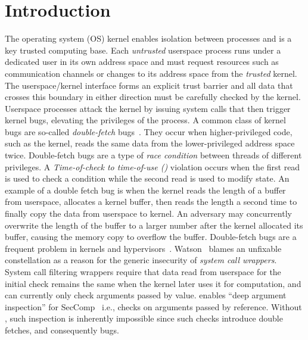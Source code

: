 \documentclass[letterpaper,twocolumn,10pt]{article}
\begin{document}
\section{Introduction}

The operating system (OS) kernel enables isolation between processes and is 
a key trusted computing
base. Each \emph{untrusted} userspace process runs under a
dedicated user in its own address space and must request resources such as
communication channels or changes to its address space from the \emph{trusted}
kernel. The userspace/kernel interface forms an explicit trust barrier
and all data that crosses this boundary in either direction must be carefully 
checked by the kernel.
%
Userspace processes attack the kernel by issuing system calls that then trigger
kernel bugs, elevating the privileges of the process.
%
A common class of kernel bugs are so-called \emph{double-fetch}
bugs~\cite{serna08doublefetch, twizsgrakky07ring0, wilhelm2016xenpwn,
wang2018survey}. They occur when higher-privileged code, such as
the kernel, reads the same data from the lower-privileged address space twice.
%
Double-fetch bugs are a type of
\emph{race condition} between threads of different privileges. A
\emph{Time-of-check to time-of-use (\tocttou)} violation occurs when the first
read is used to check a condition while the second read is used to modify
state.
%
An example of a double fetch bug is when the kernel reads the length of a buffer
from userspace, allocates a kernel buffer, then reads the length a second time
to finally copy the data from userspace to kernel. An adversary may concurrently
overwrite the length of the buffer to a larger number after the kernel allocated
its buffer, causing the memory copy to overflow the buffer.
%
Double-fetch bugs are a frequent problem in kernels and
hypervisors~\cite{cve201812633, cve202012652, cve20131332, cve201920610,
cve20158550, cve201610439, cve201610435, cve201610433, cve20195519,
cve20168438}. 
Watson~\cite{watson2007exploiting} blames an unfixable \tocttou
constellation as a reason for the generic insecurity of \emph{system call
wrappers}. 
System call filtering wrappers require that data read from userspace for the
initial check remains the same when the kernel later uses it for computation, 
and can currently only check arguments passed by value.
\midas enables ``deep argument inspection'' for SecComp~\cite{seccomp_deep, seccomp}
i.e., checks on arguments passed by reference.
Without \midas, such inspection is inherently impossible since such checks 
introduce double fetches, and consequently \tocttou bugs.
\end{document}
